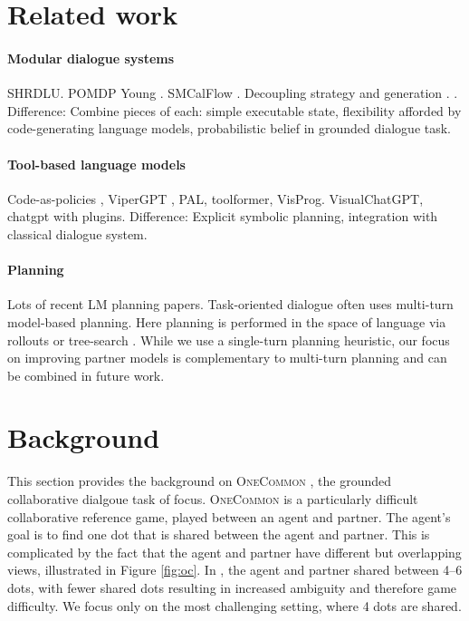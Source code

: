 \documentclass[11pt]{article}
\begin{document}
\section{Related work}

\paragraph{Modular dialogue systems}
SHRDLU. POMDP Young \citep{young2006pomdp}. SMCalFlow \citep{sm}.
Decoupling strategy and generation \citep{he2018dnd}. \citep{fstod}.
Difference: Combine pieces of each: simple executable state,
flexibility afforded by code-generating language models,
probabilistic belief in grounded dialogue task.

\paragraph{Tool-based language models}
Code-as-policies \citep{codeaspolicies2022}, ViperGPT \citep{vipergpt},
PAL, toolformer, VisProg.
VisualChatGPT, chatgpt with plugins.
Difference: Explicit symbolic planning,
integration with classical dialogue system.

\paragraph{Planning}
Lots of recent LM planning papers.
\citep{gandhi2023strategic}
Task-oriented dialogue often uses multi-turn model-based planning.
Here planning is performed in the space of language via rollouts or tree-search
\citep{dnd,yarats2017rollout,ingress,jang2020bapomdp}.
While we use a single-turn planning heuristic,
our focus on improving partner models is complementary to multi-turn planning and can be combined in future work.

\section{Background}
This section provides the background on \textsc{OneCommon} \citep{onecommon},
the grounded collaborative dialgoue task of focus.
\textsc{OneCommon} is a particularly difficult collaborative reference game,
played between an agent and partner.
The agent's goal is to find one dot that is shared between the agent and partner.
This is complicated by the fact that the agent and partner have different but 
overlapping views, illustrated in Figure \ref{fig:oc}.
In \citet{onecommon}, the agent and partner shared between 4--6 dots,
with fewer shared dots resulting in increased ambiguity and therefore game difficulty.
We focus only on the most challenging setting, where 4 dots are shared.
\end{document}
